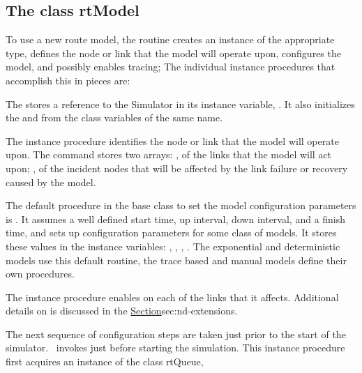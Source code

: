 \subsection{The class rtModel}
\label{sec:rtmodel}

To use a new route model, the routine 
creates an instance of the appropriate type,
defines the node or link that the model will operate upon,
configures the model,
and possibly enables tracing;
The individual instance procedures that accomplish this in pieces are:
\begin{list}{}{}
\item The 
  stores a reference to the Simulator in its instance variable, .
  It also initializes the  and 
  from the class variables of the same name.
\item The instance procedure 
  identifies the node or link that the model will operate upon.
  The command stores two arrays: , of the links that the
  model will act upon; , of the incident nodes
  that will be affected by the link failure or recovery caused by the model.
\item The default procedure in the base class
   to set the model configuration parameters is
  .
  It assumes a well defined
  start time, up interval, down interval, and a finish time,
  and sets up configuration parameters for some class of models.
  It stores these values in the instance variables:
  , , ,
  .
    The exponential and deterministic models use this default routine,
  the trace based and manual models define their own procedures.
\item %
  The instance procedure
  enables  on each of the links that it affects.
  Additional details on  is discussed in the
  \href{section on extensions to the class Link}{Section}{sec:nd-extensions}.
\end{list}
The next sequence of configuration steps are taken just prior to
the start of the simulator.
\ns\ invokes 
just before starting the simulation.
This instance procedure first acquires an instance of the class rtQueue,
